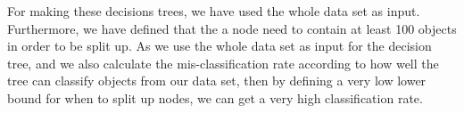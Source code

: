 For making these decisions trees, we have used the whole data set as input. Furthermore, we have defined that the a node need to contain at least 100 objects in order to be split up. As we use the whole data set as input for the decision tree, and we also calculate the mis-classification rate according to how well the tree can classify objects from our data set, then by defining a very low lower bound for when to split up nodes, we can get a very high classification rate.
